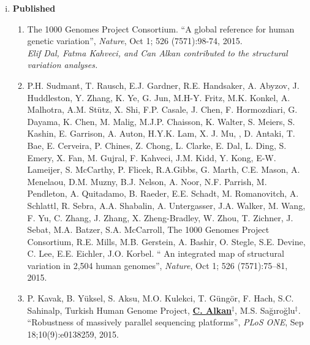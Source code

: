 % 

\begin{enumerate}[i)]
\item {\bf Published} %

\begin{enumerate}

  \item        
    The 1000 Genomes Project Consortium. ``A global reference for human genetic variation'', {\em Nature}, Oct 1; 526 (7571):98-74, 2015.\\
    {\it Elif Dal, Fatma Kahveci, and Can Alkan contributed to the structural variation analyses.}

  \item        
  P.H. Sudmant, T. Rausch, E.J. Gardner,  R.E. Handsaker, A. Abyzov, J. Huddleston, Y. Zhang, K. Ye, G. Jun, M.H-Y. Fritz, M.K. Konkel, A. Malhotra, A.M. Stütz, X. Shi, F.P. Casale, J. Chen, 
  F. Hormozdiari, G. Dayama, K. Chen, M. Malig, M.J.P. Chaisson, K. Walter, S. Meiers, S. Kashin, E. Garrison, A. Auton, H.Y.K. Lam, X. J. Mu, \calkan, D. Antaki, T. Bae, E. Cerveira, P. Chines, Z. Chong, 
  L. Clarke, E. Dal, L. Ding, S. Emery, X. Fan, M. Gujral, F. Kahveci, J.M. Kidd, Y. Kong, E-W. Lameijer, S. McCarthy, P. Flicek, R.A.Gibbs, G. Marth, C.E. Mason, A. Menelaou, D.M. Muzny, 
  B.J. Nelson, A. Noor, N.F. Parrish, M. Pendleton, A. Quitadamo, B. Raeder, E.E. Schadt, M. Romanovitch, A. Schlattl, R. Sebra, A.A. Shabalin, A. Untergasser, 
  J.A. Walker, M. Wang, F. Yu, C. Zhang, J. Zhang, X. Zheng-Bradley, W. Zhou, T. Zichner, J. Sebat, M.A. Batzer, S.A. McCarroll, 
  The 1000 Genomes Project Consortium, R.E. Mills, M.B. Gerstein, A. Bashir, O. Stegle, S.E. Devine, C. Lee, E.E. Eichler, J.O. Korbel. 
  `` An integrated map of structural variation in 2,504 human genomes'',
  {\em Nature}, Oct 1; 526 (7571):75–81, 2015.

  \item        
   P. Kavak, B. Yüksel, S. Aksu, M.O. Kulekci, T. Güngör, F. Hach, S.C. Sahinalp, Turkish Human Genome Project, {\bf {\underline {C. Alkan}}}$^\ddag$,
  M.S. Sağıroğlu$^\ddag$.    
  ``Robustness of massively parallel sequencing platforms'',
 {\em PLoS ONE},  Sep 18;10(9):e0138259, 2015.  


\end{enumerate}
\end{enumerate}

